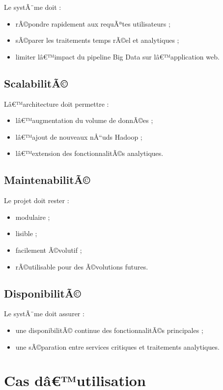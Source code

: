 ﻿\documentclass[12pt,a4paper]{report}
\begin{document}
Le systÃ¨me doit :
\begin{itemize}
    \item rÃ©pondre rapidement aux requÃªtes utilisateurs ;
    \item sÃ©parer les traitements temps rÃ©el et analytiques ;
    \item limiter lâ€™impact du pipeline Big Data sur lâ€™application web.
\end{itemize}

\subsection{ScalabilitÃ©}

Lâ€™architecture doit permettre :
\begin{itemize}
    \item lâ€™augmentation du volume de donnÃ©es ;
    \item lâ€™ajout de nouveaux nÅ“uds Hadoop ;
    \item lâ€™extension des fonctionnalitÃ©s analytiques.
\end{itemize}

\subsection{MaintenabilitÃ©}

Le projet doit rester :
\begin{itemize}
    \item modulaire ;
    \item lisible ;
    \item facilement Ã©volutif ;
    \item rÃ©utilisable pour des Ã©volutions futures.
\end{itemize}

\subsection{DisponibilitÃ©}

Le systÃ¨me doit assurer :
\begin{itemize}
    \item une disponibilitÃ© continue des fonctionnalitÃ©s principales ;
    \item une sÃ©paration entre services critiques et traitements analytiques.
\end{itemize}

\section{Cas dâ€™utilisation}
\end{document}
